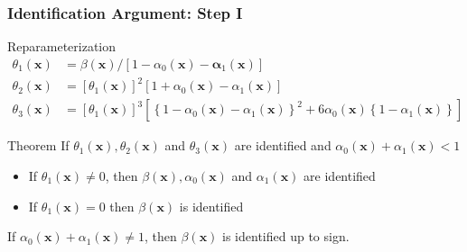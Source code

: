 \documentclass{beamer}
\begin{document}
\begin{frame}
  \frametitle{Identification Argument: Step I}
 
  \begin{block}{Reparameterization}
    \vspace{-1em}
\begin{align*}
  \theta_1(\mathbf{x}) &= \beta(\mathbf{x})/\left[ 1 - \alpha_0(\mathbf{x}) - \mathbf{\alpha}_1(\mathbf{x})  \right]\\
  \theta_2(\mathbf{x}) &= \left[\theta_1(\mathbf{x})\right]^2 \left[ 1 + \alpha_0(\mathbf{x}) - \alpha_1(\mathbf{x})\right] \\
  \theta_3(\mathbf{x}) &= \left[\theta_1(\mathbf{x})\right]^3\left[ \left\{ 1 - \alpha_0(\mathbf{x}) - \alpha_1(\mathbf{x}) \right\}^2 + 6\alpha_0(\mathbf{x})\left\{ 1 - \alpha_1(\mathbf{x}) \right\} \right]
\end{align*}
  \end{block}

  \begin{alertblock}{Theorem}
    If $\theta_1(\mathbf{x}), \theta_2(\mathbf{x})$ and $\theta_3(\mathbf{x})$ are identified and $\alpha_0(\mathbf{x}) + \alpha_1(\mathbf{x}) <1$
    \begin{itemize}
      \item If $\theta_1(\mathbf{x})\neq 0$, then $\beta(\mathbf{x}), \alpha_0(\mathbf{x})$ and $\alpha_1(\mathbf{x})$ are identified 
      \item If $\theta_1(\mathbf{x}) = 0$ then $\beta(\mathbf{x})$ is identified %
    \end{itemize}
    If $\alpha_0(\mathbf{x}) + \alpha_1(\mathbf{x}) \neq 1$,  then $\beta(\mathbf{x})$ is identified up to sign.
  \end{alertblock}
  
\end{frame}
\end{document}
